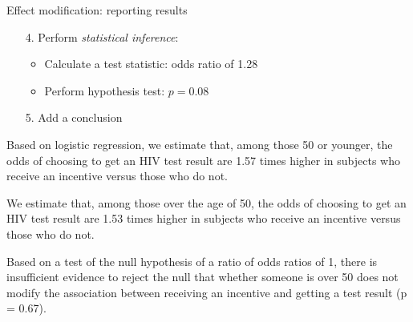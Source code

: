 \documentclass[10pt,t]{beamer}
\begin{document}
\begin{frame}{Effect modification: reporting results}
	\vspace{-5mm}
	
	\begin{enumerate}
		\item[4.] Perform \textit{statistical inference}:
		\begin{itemize}
			\item Calculate a test statistic: odds ratio of 1.28
			\item Perform hypothesis test: $p = 0.08$
		\end{itemize}
		\item[5.] Add a conclusion
	\end{enumerate}
	
	\medskip
	
	Based on logistic regression, we estimate that, among those 50 or younger, the odds of choosing to get an HIV test result are 1.57 times higher in subjects who receive an incentive versus those who do not. 
	
	\medskip
	
	We estimate that, among those over the age of 50, the odds of choosing to get an HIV test result are 1.53 times higher in subjects who receive an incentive versus those who do not. 
	
	\medskip
	
	Based on a test of the null hypothesis of a ratio of odds ratios of 1, there is insufficient evidence to reject the null that whether someone is over 50 does not modify the association between receiving an incentive and getting a test result (p = 0.67). 
\end{frame}
\end{document}
